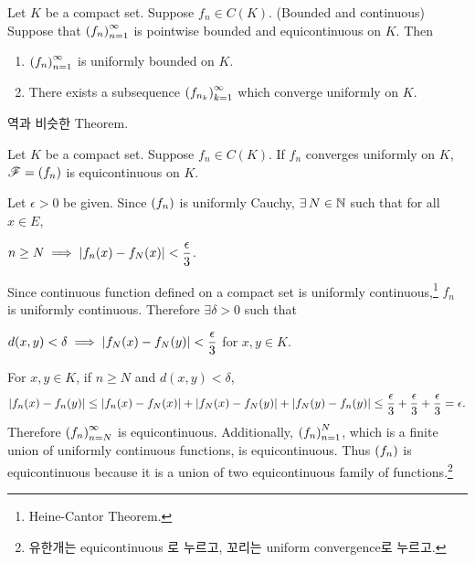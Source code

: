 \medskip

 Let \(K\) be a compact set. Suppose \(f_n \in C(K)\). (Bounded and continuous) Suppose that \(\left( f_n \right)_{n=1}^\infty\) is pointwise bounded and equicontinuous on \(K\). Then
\begin{enumerate}
    \item \(\left( f_n \right)_{n=1}^\infty\) is uniformly bounded on \(K\).
    \item There exists a subsequence \(\left( f_{n_k} \right)_{k=1}^\infty\) which converge uniformly on \(K\).
\end{enumerate}

\rmk 역과 비슷한 Theorem.

 Let \(K\) be a compact set. Suppose \(f_n \in C(K)\). If \(f_n\) converges uniformly on \(K\), \(\mathscr{F} = \left( f_n \right)\) is equicontinuous on \(K\).

\pf Let \(\epsilon > 0\) be given. Since \(\left( f_n \right)\) is uniformly Cauchy, \(\exists N\in \N\) such that for all \(x \in E\),
\begin{center}
    \(n\geq N \implies \left| f_n(x)  - f_N(x) \right| < \dfrac{\epsilon}{3}\).
\end{center}
Since continuous function defined on a compact set is uniformly continuous,\footnote{Heine-Cantor Theorem.} \(f_n\) is uniformly continuous. Therefore \(\exists \delta > 0\) such that
\begin{center}
    \(d(x, y) < \delta \implies \left| f_N(x) - f_N(y) \right| < \dfrac{\epsilon}{3}\) for \(x, y \in K\).
\end{center}
For \(x, y\in K\), if \(n \geq N\) and \(d(x, y) < \delta\),
\[
    \left| f_n(x) - f_n(y) \right| \leq \left| f_n(x) - f_N(x) \right| + \left| f_N(x) - f_N(y) \right| + \left| f_N(y) - f_n(y) \right| \leq \frac{\epsilon}{3} + \frac{\epsilon}{3} + \frac{\epsilon}{3} = \epsilon.
\]
Therefore \(\left( f_n \right)_{n=N}^\infty\) is equicontinuous. Additionally, \(\left( f_n \right)_{n=1}^N\), which is a finite union of uniformly continuous functions, is equicontinuous. Thus \(\left( f_n \right)\) is equicontinuous because it is a union of two equicontinuous family of functions.\footnote{유한개는 equicontinuous 로 누르고, 꼬리는 uniform convergence로 누르고.}

\pagebreak
